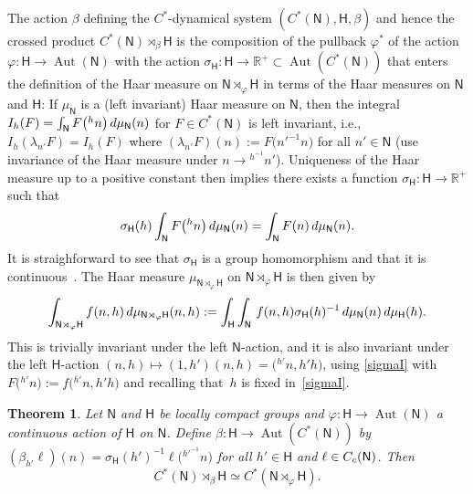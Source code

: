 \documentclass[11pt]{article}
\numberwithin{equation}{section}
\numberwithin{equation}{section}
\def\dd{{\rm d}}
\newcommand{\sfH}{\mathsf{H}}
\newcommand{\sfN}{\mathsf{N}}
\newcommand{\Aut}{\operatorname{Aut}}
\newcommand{\real}{{\mathbb R}} %
\newtheorem{Theorem}{Theorem}[section]
\begin{document}
The action $\beta$
defining the $C^*$-dynamical system $(C^*(\sfN ),\sfH ,\beta)$ and hence the crossed
product $C^*(\sfN )\rtimes_\beta \sfH $ is the composition
of the pullback $\varphi^*$ of the action $\varphi\colon \sfH \to \Aut(\sfN )$ with
the action $\sigma_\sfH\colon \sfH \to \real^+\subset \Aut(C^*(\sfN ))$ that enters the
definition of the Haar measure on $\sfN \rtimes_\varphi \sfH $ in terms of the Haar
measures on $\sfN $ and $\sfH $: If $\mu_\sfN $ is a (left invariant)
Haar measure on $\sfN $, then the integral
$I_h(F)=\int_\sfN F\big({}^hn\big)\, \dd\mu_\sfN (n)$ for $F\in C^*(\sfN )$
is left invariant, i.e.,
$I_h(\lambda_{n'}F)= I_h(F)$ where $(\lambda_{n'}F)(n):=F\big(n'^{-1} n\big)$
for all $n'\in \sfN $
(use invariance of the Haar measure under $n\to {}^{h^{-1\!}}n'$).
Uniqueness of the Haar measure up to a positive constant then
implies there exists a function $\sigma_\sfH\colon \sfH\to\real^+$ such that
\begin{gather}\label{sigmaI}
\sigma_\sfH(h) \int_\sfN F\big({}^hn\big) \, \dd\mu_\sfN (n)=\int_\sfN F(n)
\, \dd\mu_\sfN (n) .
\end{gather}
It is straighforward to see that
$\sigma_\sfH$ is a group homomorphism and that it is
continuous~\cite[Section~2]{Williams2007}. The Haar measure
$\mu_{\sfN\rtimes_\varphi\sfH}$ on
$\sfN \rtimes_\varphi \sfH $ is then given by
\[
\int_{\sfN\rtimes_\varphi\sfH} f(n,h) \,
\dd\mu_{\sfN\rtimes_\varphi\sfH}(n,h) := \int_\sfH \int_\sfN\,
f(n,h) \sigma_\sfH(h)^{-1} \, \dd\mu_\sfN (n) \, \dd\mu_\sfH (h) .
\]
This is trivially invariant under the left $\sfN $-action, and
it is also invariant under the left $\sfH $-action $(n,h)\mapsto
(1,h') (n,h)=\big({}^{h'\!}n, h' h\big)$, using \eqref{sigmaI} with $F\big({}^{h'\!}n\big) :=f\big({}^{h'\!}n, h' h\big)$
and recalling that~$h$ is fixed in~\eqref{sigmaI}.

\begin{Theorem}\label{cpsp2}
Let $\sfN $ and $\sfH $ be locally compact groups
 and $\varphi \colon \sfH \to \Aut(\sfN )$ a continuous action of $\sfH $ on $\sfN $. Define
$\beta\colon \sfH \to \Aut(C^*(\sfN ))$ by $(\beta_{h'}\ell)
(n)=\sigma_\sfH(h')^{-1} \ell\big({}^{h'^{-1\!}}n\big)$ for all $h'\in \sfH $ and
$\ell\in C_{\rm c}(\sfN )$. Then
\[
C^*(\sfN )\rtimes_{\beta}\sfH \simeq C^*(\sfN \rtimes_\varphi
\sfH ) .
\]
\end{Theorem}
\end{document}
